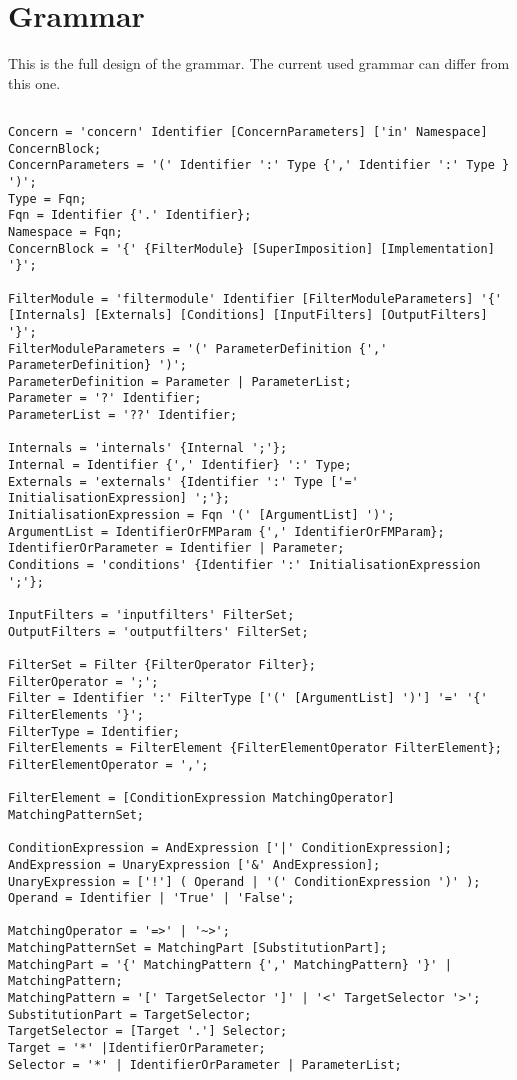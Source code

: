\chapter{Grammar}
This is the full design of the grammar. The current used grammar can differ from this one.

\begin{lstlisting}[label=lst::proposedgrammar,style=listing,language=ebnf]

Concern = 'concern' Identifier [ConcernParameters] ['in' Namespace] ConcernBlock;
ConcernParameters = '(' Identifier ':' Type {',' Identifier ':' Type } ')';
Type = Fqn;
Fqn = Identifier {'.' Identifier};
Namespace = Fqn;
ConcernBlock = '{' {FilterModule} [SuperImposition] [Implementation] '}';

FilterModule = 'filtermodule' Identifier [FilterModuleParameters] '{' [Internals] [Externals] [Conditions] [InputFilters] [OutputFilters] '}';
FilterModuleParameters = '(' ParameterDefinition {',' ParameterDefinition} ')';
ParameterDefinition = Parameter | ParameterList;
Parameter = '?' Identifier;
ParameterList = '??' Identifier;

Internals = 'internals' {Internal ';'};
Internal = Identifier {',' Identifier} ':' Type;
Externals = 'externals' {Identifier ':' Type ['=' InitialisationExpression] ';'};
InitialisationExpression = Fqn '(' [ArgumentList] ')';
ArgumentList = IdentifierOrFMParam {',' IdentifierOrFMParam};
IdentifierOrParameter = Identifier | Parameter;
Conditions = 'conditions' {Identifier ':' InitialisationExpression ';'};

InputFilters = 'inputfilters' FilterSet;
OutputFilters = 'outputfilters' FilterSet;

FilterSet = Filter {FilterOperator Filter};
FilterOperator = ';';
Filter = Identifier ':' FilterType ['(' [ArgumentList] ')'] '=' '{' FilterElements '}';
FilterType = Identifier;
FilterElements = FilterElement {FilterElementOperator FilterElement};
FilterElementOperator = ',';

FilterElement = [ConditionExpression MatchingOperator] MatchingPatternSet;

ConditionExpression = AndExpression ['|' ConditionExpression];
AndExpression = UnaryExpression ['&' AndExpression];
UnaryExpression = ['!'] ( Operand | '(' ConditionExpression ')' );
Operand = Identifier | 'True' | 'False';

MatchingOperator = '=>' | '~>';
MatchingPatternSet = MatchingPart [SubstitutionPart];
MatchingPart = '{' MatchingPattern {',' MatchingPattern} '}' | MatchingPattern;
MatchingPattern = '[' TargetSelector ']' | '<' TargetSelector '>';
SubstitutionPart = TargetSelector;
TargetSelector = [Target '.'] Selector;
Target = '*' |IdentifierOrParameter;
Selector = '*' | IdentifierOrParameter | ParameterList;


\end{lstlisting}
